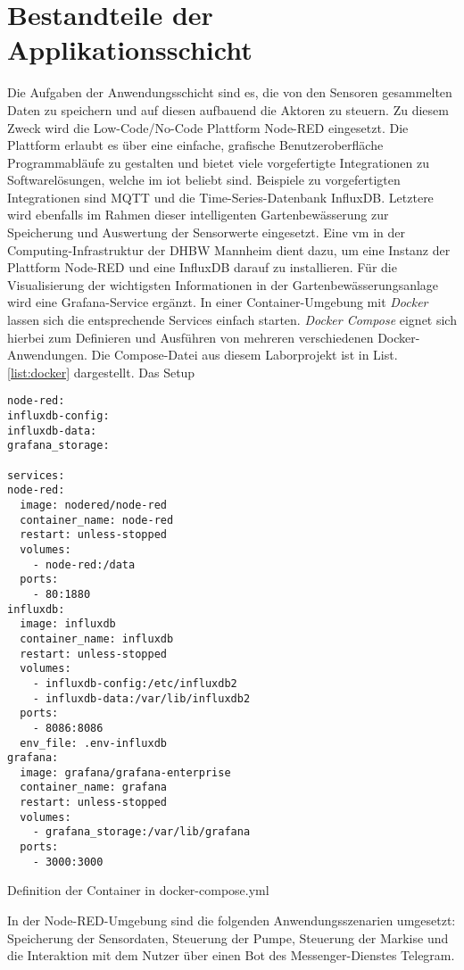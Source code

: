 
\section{Bestandteile der Applikationsschicht}

Die Aufgaben der Anwendungsschicht sind es, die von den Sensoren gesammelten Daten zu speichern und auf diesen aufbauend die Aktoren zu steuern.
Zu diesem Zweck wird die Low-Code/No-Code Plattform Node-RED eingesetzt. Die Plattform erlaubt es über eine einfache, grafische Benutzeroberfläche Programmabläufe zu gestalten und bietet viele vorgefertigte Integrationen zu Softwarelösungen, welche im \gls{iot} beliebt sind.
Beispiele zu vorgefertigten Integrationen sind MQTT und die Time-Series-Datenbank InfluxDB.
Letztere wird ebenfalls im Rahmen dieser intelligenten Gartenbewässerung zur Speicherung und Auswertung der Sensorwerte eingesetzt. Eine \gls{vm} in der Computing-Infrastruktur der DHBW Mannheim dient dazu, um eine Instanz der Plattform Node-RED und eine InfluxDB darauf zu installieren. Für die Visualisierung der wichtigsten Informationen in der Gartenbewässerungsanlage wird eine Grafana-Service ergänzt. 
In einer Container-Umgebung mit \textit{Docker} lassen sich die entsprechende Services einfach starten. \textit{Docker Compose} eignet sich hierbei zum Definieren und Ausführen von mehreren verschiedenen Docker-Anwendungen. Die Compose-Datei aus diesem Laborprojekt ist in List. \ref{list:docker} dargestellt. Das Setup 

\begin{listing}[!ht]
\begin{verbatim}
node-red:
influxdb-config:
influxdb-data:
grafana_storage:

services:
node-red:
  image: nodered/node-red
  container_name: node-red
  restart: unless-stopped
  volumes:
    - node-red:/data
  ports:
    - 80:1880
influxdb:
  image: influxdb
  container_name: influxdb
  restart: unless-stopped
  volumes:
    - influxdb-config:/etc/influxdb2
    - influxdb-data:/var/lib/influxdb2
  ports:
    - 8086:8086
  env_file: .env-influxdb
grafana:
  image: grafana/grafana-enterprise
  container_name: grafana
  restart: unless-stopped
  volumes:
    - grafana_storage:/var/lib/grafana
  ports:
    - 3000:3000
\end{verbatim}
\caption{Definition der Container in docker-compose.yml}
\label{list:docker}
\end{listing}  

In der Node-RED-Umgebung sind die folgenden Anwendungsszenarien umgesetzt: Speicherung der Sensordaten, Steuerung der Pumpe, Steuerung der Markise und die Interaktion mit dem Nutzer über einen Bot des Messenger-Dienstes Telegram.

